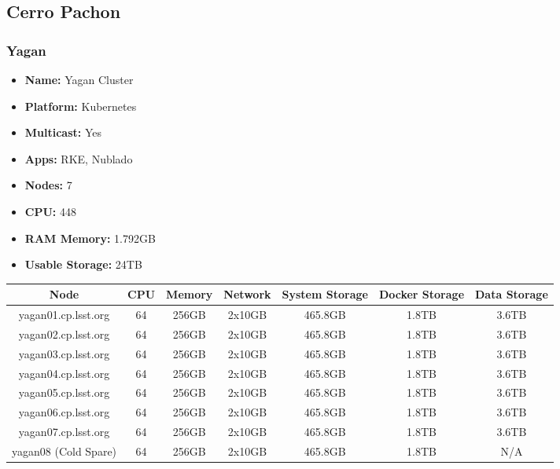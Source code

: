 \newpage
\subsection{Cerro Pachon}
\subsubsection{Yagan}
\begin{itemize}
  \itemsep0em 
  \item \textbf{Name:}       Yagan Cluster
  \item \textbf{Platform:}   Kubernetes
  \item \textbf{Multicast:}  Yes
  \item \textbf{Apps:}       RKE, Nublado
  \item \textbf{Nodes:}      7
  \item \textbf{CPU:}        448
  \item \textbf{RAM Memory:} 1.792GB
  \item \textbf{Usable Storage:} 24TB
\end{itemize}
\begin{center}
  \small
  \begin{tabular}{||c c c c c c c||} 
    \hline
    \textbf{Node} & \textbf{CPU} & \textbf{Memory} & \textbf{Network} & \textbf{System Storage} & \textbf{Docker Storage} & \textbf{Data Storage} \\ [0.5ex]
    \hline
    yagan01.cp.lsst.org & 64 & 256GB & 2x10GB & 465.8GB & 1.8TB & 3.6TB \\
    \hline
    yagan02.cp.lsst.org & 64 & 256GB & 2x10GB & 465.8GB & 1.8TB & 3.6TB \\
    \hline
    yagan03.cp.lsst.org & 64 & 256GB & 2x10GB & 465.8GB & 1.8TB & 3.6TB \\
    \hline
    yagan04.cp.lsst.org & 64 & 256GB & 2x10GB & 465.8GB & 1.8TB & 3.6TB \\
    \hline
    yagan05.cp.lsst.org & 64 & 256GB & 2x10GB & 465.8GB & 1.8TB & 3.6TB \\
    \hline
    yagan06.cp.lsst.org & 64 & 256GB & 2x10GB & 465.8GB & 1.8TB & 3.6TB \\
    \hline
    yagan07.cp.lsst.org & 64 & 256GB & 2x10GB & 465.8GB & 1.8TB & 3.6TB \\
    \hline    
    yagan08 (Cold Spare) & 64 & 256GB & 2x10GB & 465.8GB & 1.8TB & N/A \\
    \hline    
  \end{tabular}
\end{center}

